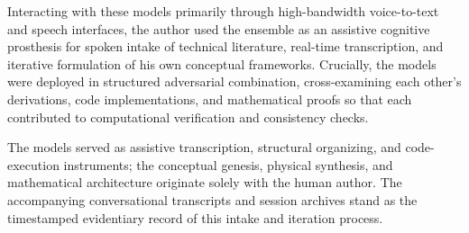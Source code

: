 \documentclass[11pt,a4paper]{article}
\begin{document}
Interacting with these models primarily through high-bandwidth voice-to-text and speech interfaces, the author used the ensemble as an assistive cognitive prosthesis for spoken intake of technical literature, real-time transcription, and iterative formulation of his own conceptual frameworks. Crucially, the models were deployed in structured adversarial combination, cross-examining each other's derivations, code implementations, and mathematical proofs so that each contributed to computational verification and consistency checks.

The models served as assistive transcription, structural organizing, and code-execution instruments; the conceptual genesis, physical synthesis, and mathematical architecture originate solely with the human author. The accompanying conversational transcripts and session archives stand as the timestamped evidentiary record of this intake and iteration process.
\end{document}
